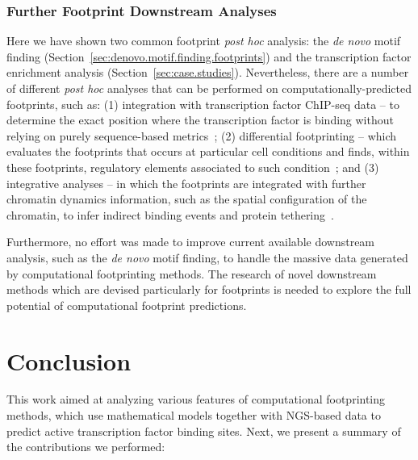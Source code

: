 \subsubsection{Further Footprint Downstream Analyses}

Here we have shown two common footprint \emph{post hoc} analysis: the \emph{de novo} motif finding (Section~\ref{sec:denovo.motif.finding.footprints}) and the transcription factor enrichment analysis (Section~\ref{sec:case.studies}). Nevertheless, there are a number of different \emph{post hoc} analyses that can be performed on computationally-predicted footprints, such as: (1) integration with transcription factor ChIP-seq data -- to determine the exact position where the transcription factor is binding without relying on purely sequence-based metrics~\cite{pique2011}; (2) differential footprinting -- which evaluates the footprints that occurs at particular cell conditions and finds, within these footprints, regulatory elements associated to such condition~\cite{he2012}; and (3) integrative analyses -- in which the footprints are integrated with further chromatin dynamics information, such as the spatial configuration of the chromatin, to infer indirect binding events and protein tethering~\cite{thurman2012}.

Furthermore, no effort was made to improve current available downstream analysis, such as the \emph{de novo} motif finding, to handle the massive data generated by computational footprinting methods. The research of novel downstream methods which are devised particularly for footprints is needed to explore the full potential of computational footprint predictions.

\section{Conclusion}
\label{sec:conclusion.6}

This work aimed at analyzing various features of computational footprinting methods, which use mathematical models together with NGS-based data to predict active transcription factor binding sites. Next, we present a summary of the contributions we performed:


